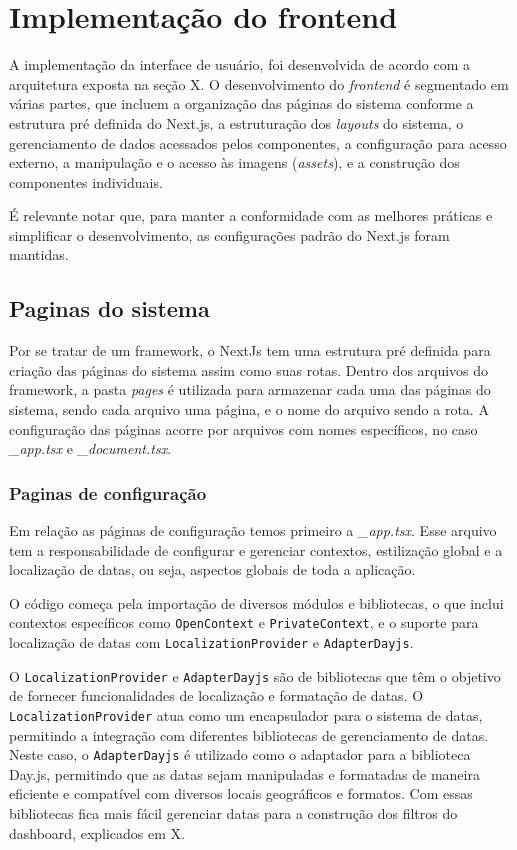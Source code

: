 \section[Implementação do frontend]{Implementação do frontend}
A implementação da interface de usuário, foi desenvolvida de acordo com a arquitetura exposta na seção X. O desenvolvimento do \textit{frontend} é segmentado em várias partes, que incluem a organização das páginas do sistema conforme a estrutura pré definida do Next.js, a estruturação dos \textit{layouts} do sistema, o gerenciamento de dados acessados pelos componentes, a configuração para acesso externo, a manipulação e o acesso às imagens (\textit{assets}), e a construção dos componentes individuais.

É relevante notar que, para manter a conformidade com as melhores práticas e simplificar o desenvolvimento, as configurações padrão do Next.js foram mantidas.

\subsection{Paginas do sistema}\label{subsec:}
Por se tratar de um framework, o NextJs tem uma estrutura pré definida para criação das páginas do sistema assim como suas rotas. Dentro dos arquivos do framework, a pasta \textit{pages} é utilizada para armazenar cada uma das páginas do sistema, sendo cada arquivo uma página, e o nome do arquivo sendo a rota. A configuração das páginas acorre por arquivos com nomes específicos, no caso \textit{\_app.tsx} e \textit{\_document.tsx}.

\subsubsection{Paginas de configuração}\label{subsec:}
Em relação as páginas de configuração temos primeiro a \textit{\_app.tsx}. Esse arquivo tem a responsabilidade de configurar e gerenciar contextos, estilização global e a localização de datas, ou seja, aspectos globais de toda a aplicação.

O código começa pela importação de diversos módulos e bibliotecas, o que inclui contextos específicos como \texttt{OpenContext} e \texttt{PrivateContext}, e o suporte para localização de datas com \texttt{LocalizationProvider} e \texttt{AdapterDayjs}.

O \texttt{LocalizationProvider} e \texttt{AdapterDayjs} são de bibliotecas que têm o objetivo de fornecer funcionalidades de localização e formatação de datas. O \texttt{LocalizationProvider} atua como um encapsulador para o sistema de datas, permitindo a integração com diferentes bibliotecas de gerenciamento de datas. Neste caso, o \texttt{AdapterDayjs} é utilizado como o adaptador para a biblioteca Day.js, permitindo que as datas sejam manipuladas e formatadas de maneira eficiente e compatível com diversos locais geográficos e formatos. Com essas bibliotecas fica mais fácil gerenciar datas para a construção dos filtros do dashboard, explicados em X. %

